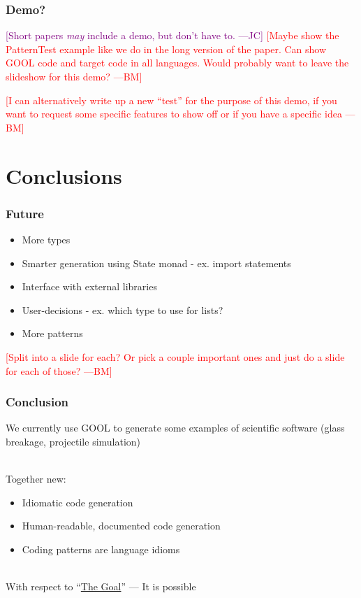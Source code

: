 \documentclass{beamer}
\newcommand{\authornote}[3]{\textcolor{#1}{[#3 ---#2]}}
\newcommand{\bmac}[1]{\authornote{red}{BM}{#1}}
\newcommand{\jc}[1]{\authornote{purple}{JC}{#1}}
\begin{document}
\begin{frame}

\frametitle{Demo?}

\jc{Short papers \emph{may} include a demo, but don't have to.}
\bmac{Maybe show the PatternTest example like we do in the long version of the 
paper. Can show GOOL code and target code in all languages. Would probably want 
to leave the slideshow for this demo?}

\bmac{I can alternatively write up a new ``test'' for the purpose of this demo, 
if you want to request some specific features to show off or if you have a 
specific idea}

\end{frame}


\section[Conclusions]{Conclusions}


\begin{frame}

\frametitle{Future}

\begin{itemize}
  \item More types
  \item Smarter generation using State monad - ex. import statements
  \item Interface with external libraries
  \item User-decisions - ex. which type to use for lists?
  \item More patterns
\end{itemize}

\bmac{Split into a slide for each? Or pick a couple important ones and just do 
a slide for each of those?}

\end{frame}


\begin{frame}

\frametitle{Conclusion}

We currently use GOOL to generate some examples of scientific software (glass 
breakage, projectile simulation)\\~\

Together new:
\begin{itemize}
  \item Idiomatic code generation
  \item Human-readable, documented code generation
  \item Coding patterns are language idioms\\~\
\end{itemize}

With respect to ``\hyperref[goal]{The Goal}'' --- It is possible\\~\


\end{frame}
\end{document}
